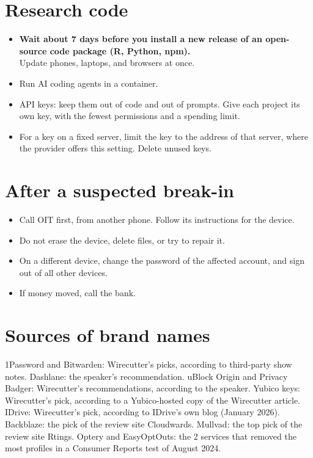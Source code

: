 \documentclass[10pt]{article}
\begin{document}
\section{Research code}
\begin{itemize}
\item \textbf{Wait about 7 days before you install a new release of an open-source code package (R, Python, npm).}\\{\small Update phones, laptops, and browsers at once.}
\item Run AI coding agents in a container.
\item API keys: keep them out of code and out of prompts. Give each project its own key, with the fewest permissions and a spending limit.
\item For a key on a fixed server, limit the key to the address of that server, where the provider offers this setting. Delete unused keys.
\end{itemize}
\section{After a suspected break-in}
\begin{itemize}
\item Call OIT first, from another phone. Follow its instructions for the device.
\item Do not erase the device, delete files, or try to repair it.
\item On a different device, change the password of the affected account, and sign out of all other devices.
\item If money moved, call the bank.
\end{itemize}

\section{Sources of brand names}
{\small 1Password and Bitwarden: Wirecutter's picks, according to third-party show notes. Dashlane: the speaker's recommendation. uBlock Origin and Privacy Badger: Wirecutter's recommendations, according to the speaker. Yubico keys: Wirecutter's pick, according to a Yubico-hosted copy of the Wirecutter article. IDrive: Wirecutter's pick, according to IDrive's own blog (January 2026). Backblaze: the pick of the review site Cloudwards. Mullvad: the top pick of the review site Rtings. Optery and EasyOptOuts: the 2 services that removed the most profiles in a Consumer Reports test of August 2024.}
\end{document}
